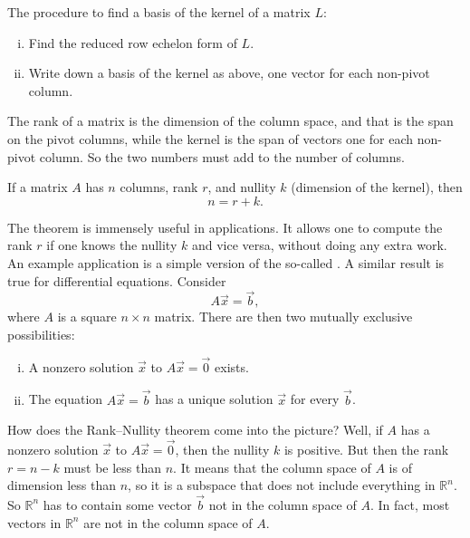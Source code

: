 \pagebreak[2]
The procedure to find a basis of the kernel of a matrix $L$:
\begin{enumerate}[(i)]
\item Find the reduced row echelon form of $L$.
\item Write down a basis of the kernel as above, one vector for each
non-pivot column.
\end{enumerate}


The rank of a matrix is the dimension of the column space, and that is
the span on the pivot columns, while the kernel is the span of vectors
one for each non-pivot column.  So the two numbers must add to the number of
columns.

\begin{theorem}
If a matrix $A$ has $n$ columns, rank $r$, and nullity $k$ (dimension of the
kernel), then
\begin{equation*}
n = r+k .
\end{equation*}
\end{theorem}

The theorem is immensely useful in applications.  It allows one to compute
the rank $r$ if one knows the nullity $k$ and vice versa, without doing any
extra work.
An example application is a simple version of the so-called
\emph{}.  A similar result is true for
differential equations.  Consider
\begin{equation*}
A \vec{x} = \vec{b} ,
\end{equation*}
where $A$ is a square $n \times n$ matrix.
There are then two mutually exclusive possibilities:
\begin{enumerate}[(i)]
\item
A nonzero solution $\vec{x}$ to $A \vec{x} = \vec{0}$ exists.
\item
The equation $A \vec{x} = \vec{b}$ has a unique solution $\vec{x}$ for every
$\vec{b}$.
\end{enumerate}
How does the Rank--Nullity theorem come into the picture?  Well, if $A$ has
a nonzero solution $\vec{x}$ to $A \vec{x} = \vec{0}$, then the nullity $k$ is
positive.  But then the rank $r = n-k$ must be less than $n$.
It means that the column space of $A$ is of dimension less than $n$, so it is
a subspace that does not include everything in ${\mathbb{R}}^n$.
So ${\mathbb{R}}^n$ has to
contain some vector $\vec{b}$ not in the column space of $A$.  In fact, most
vectors in ${\mathbb{R}}^n$ are not in the column space of $A$.



